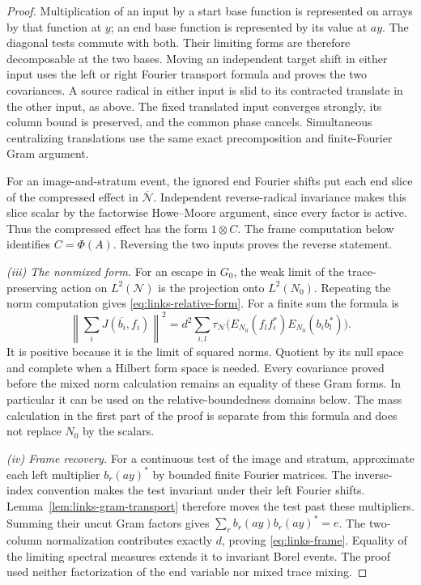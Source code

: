 \begin{proof}
Multiplication of an input by a start base function is represented
on arrays by that function at \(y\); an end base function is
represented by its value at \(ay\). The diagonal tests commute
with both. Their limiting forms are therefore decomposable at the
two bases. Moving an independent target shift in either input
uses the left or right Fourier transport formula and proves the
two covariances. A source radical in either input is slid to its
contracted translate in the other input, as above. The fixed
translated input converges strongly, its column bound is preserved,
and the common phase cancels. Simultaneous centralizing translations
use the same exact precomposition and finite-Fourier Gram argument.

For an image-and-stratum event, the ignored end Fourier shifts put
each end slice of the compressed effect in
\(\overline{\mathcal N}\). Independent reverse-radical
invariance makes this slice scalar by the factorwise Howe--Moore
argument, since every factor is active. Thus the compressed effect
has the form \(1\otimes C\). The frame computation below
identifies \(C=\Phi(A)\). Reversing the two inputs proves the
reverse statement.

\emph{(iii) The nonmixed form.}
For an escape in \(G_0\), the weak limit of the trace-preserving
action on \(L^2(\mathcal N)\) is the projection onto
\(L^2(N_0)\). Repeating the norm computation gives
\eqref{eq:links-relative-form}. For a finite sum the formula is
\begin{equation}
 \left\|\sum_iJ(\overline{b_i},f_i)\right\|^2
 =d^2\sum_{i,l}\tau_{\mathcal N}
       \bigl(E_{N_0}(f_lf_i^*)E_{N_0}(b_ib_l^*)\bigr).
 \label{eq:links-polarized-relative}
\end{equation}
It is positive because it is the limit of squared norms. Quotient
by its null space and complete when a Hilbert form space is needed.
Every covariance proved before the mixed norm calculation remains
an equality of these Gram forms. In particular it can be used on
the relative-boundedness domains below. The mass calculation in
the first part of the proof is separate from this formula and
does not replace \(N_0\) by the scalars.

\emph{(iv) Frame recovery.}
For a continuous test of the image and stratum, approximate each
left multiplier \(b_r(ay)^*\) by bounded finite Fourier matrices.
The inverse-index convention makes the test invariant under their
left Fourier shifts. Lemma~\ref{lem:links-gram-transport} therefore
moves the test past these multipliers. Summing their uncut Gram
factors gives
\(\sum_r b_r(ay)b_r(ay)^*=e\). The two-column normalization
contributes exactly \(d\), proving
\eqref{eq:links-frame}. Equality of the limiting spectral measures
extends it to invariant Borel events. The proof used neither
factorization of the end variable nor mixed trace mixing.


\end{proof}
